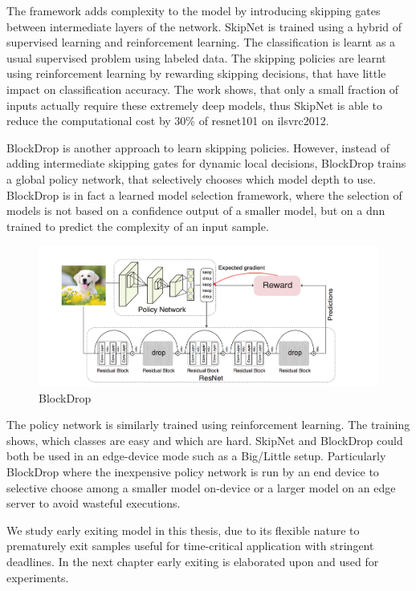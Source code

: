 The framework adds complexity to the model by introducing skipping gates between intermediate layers of the network. SkipNet is trained using a hybrid of supervised learning and reinforcement learning. The classification is learnt as a usual supervised problem using labeled data. The skipping policies are learnt using reinforcement learning by rewarding skipping decisions, that have little impact on classification accuracy. The work shows, that only a small fraction of inputs actually require these extremely deep models, thus SkipNet is able to reduce the computational cost by 30\% of \gls{resnet}101 on \gls{ilsvrc2012}. 

BlockDrop \cite{wu_blockdrop:_2017} is another approach to learn skipping policies. However, instead of adding intermediate skipping gates for dynamic local decisions, BlockDrop trains a global policy network, that selectively chooses which model depth to use. BlockDrop is in fact a learned model selection framework, where the selection of models is not based on a confidence output of a smaller model, but on a \gls{dnn} trained to predict the complexity of an input sample. 

\begin{figure}
	\centering
	\includegraphics[width=\linewidth]{figures/models/blockdrop}
	\caption[BlockDrop]{BlockDrop}
\end{figure}

The policy network is similarly trained using reinforcement learning. The training shows, which classes are easy and which are hard. SkipNet and BlockDrop could both be used in an edge-device mode such as a Big/Little \cite{park_big/little_2015} setup. Particularly BlockDrop where the inexpensive policy network is run by an end device to selective choose among a smaller model on-device or a larger model on an edge server to avoid wasteful executions.

We study early exiting model in this thesis, due to its flexible nature to prematurely exit samples useful for time-critical application with stringent deadlines. In the next chapter early exiting is elaborated upon and used for experiments.



